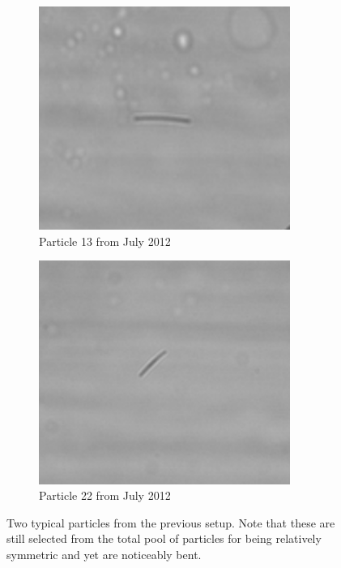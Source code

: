 \label{sec:particle_improves}
\begin{figure}[H]
\centering
\begin{subfigure}[b]{0.45\textwidth}
\includegraphics[width=0.9\textwidth]{figures/improvements/oldparticle2.png}
\caption{Particle 13 from July 2012}
\end{subfigure}
\begin{subfigure}[b]{0.45\textwidth}
\includegraphics[width=0.9\textwidth]{figures/improvements/oldparticle3.png}
\caption{Particle 22 from July 2012}
\end{subfigure}
\caption{Two typical particles from the previous setup. Note that these are still selected from the total pool of particles for being relatively symmetric and yet are noticeably bent.}
\label{fig:oldparticles}
\end{figure}




